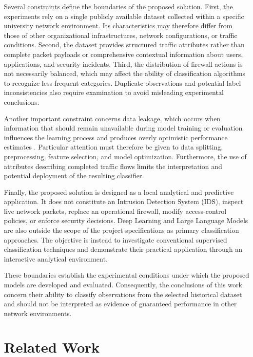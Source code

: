 Several constraints define the boundaries of the proposed solution. First, the experiments rely on a single publicly available dataset collected within a specific university network environment. Its characteristics may therefore differ from those of other organizational infrastructures, network configurations, or traffic conditions. Second, the dataset provides structured traffic attributes rather than complete packet payloads or comprehensive contextual information about users, applications, and security incidents. Third, the distribution of firewall actions is not necessarily balanced, which may affect the ability of classification algorithms to recognize less frequent categories. Duplicate observations and potential label inconsistencies also require examination to avoid misleading experimental conclusions.

Another important constraint concerns data leakage, which occurs when information that should remain unavailable during model training or evaluation influences the learning process and produces overly optimistic performance estimates \cite{kaufman2012leakage}. Particular attention must therefore be given to data splitting, preprocessing, feature selection, and model optimization. Furthermore, the use of attributes describing completed traffic flows limits the interpretation and potential deployment of the resulting classifier.

Finally, the proposed solution is designed as a local analytical and predictive application. It does not constitute an Intrusion Detection System (IDS), inspect live network packets, replace an operational firewall, modify access-control policies, or enforce security decisions. Deep Learning and Large Language Models are also outside the scope of the project specifications as primary classification approaches. The objective is instead to investigate conventional supervised classification techniques and demonstrate their practical application through an interactive analytical environment.

These boundaries establish the experimental conditions under which the proposed models are developed and evaluated. Consequently, the conclusions of this work concern their ability to classify observations from the selected historical dataset and should not be interpreted as evidence of guaranteed performance in other network environments.

\section{Related Work}

